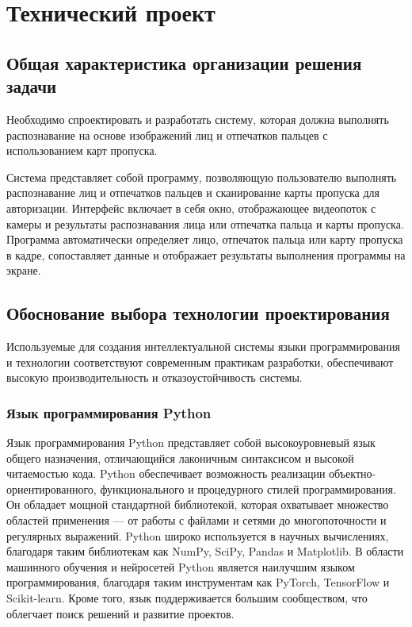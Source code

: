 \section{Технический проект}
\subsection{Общая характеристика организации решения задачи}

Необходимо спроектировать и разработать систему, которая должна выполнять распознавание на основе изображений лиц и отпечатков пальцев с использованием карт пропуска.

Система представляет собой программу, позволяющую пользователю выполнять распознавание лиц и отпечатков пальцев и сканирование карты пропуска для авторизации. Интерфейс включает в себя окно, отображающее видеопоток с камеры и результаты распознавания лица или отпечатка пальца и карты пропуска. Программа автоматически определяет лицо, отпечаток пальца или карту пропуска в кадре, сопоставляет данные и отображает результаты выполнения программы на экране. 

\subsection{Обоснование выбора технологии проектирования}

Используемые для создания интеллектуальной системы языки программирования и технологии соответствуют современным практикам разработки, обеспечивают высокую производительность и отказоустойчивость системы.

\subsubsection{Язык программирования Python}

Язык программирования Python представляет собой высокоуровневый язык общего назначения, отличающийся лаконичным синтаксисом и высокой читаемостью кода\cite{py1}. Python обеспечивает возможность реализации объектно-ориентированного, функционального и процедурного стилей программирования\cite{python}. Он обладает мощной стандартной библиотекой, которая охватывает множество областей применения — от работы с файлами и сетями до многопоточности и регулярных выражений\cite{pyt}. Python широко используется в научных вычислениях, благодаря таким библиотекам как NumPy, SciPy, Pandas и Matplotlib. В области машинного обучения и нейросетей Python является наилучшим языком программирования, благодаря таким инструментам как PyTorch, TensorFlow и Scikit-learn. Кроме того, язык поддерживается большим сообществом, что облегчает поиск решений и развитие проектов\cite{py2}.

